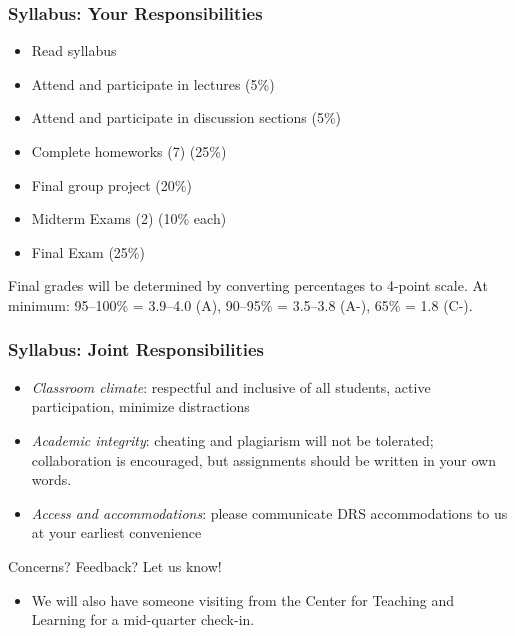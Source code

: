 \documentclass[12pt, 
hyperref={colorlinks=true, linkcolor=blue, urlcolor=cyan}]{beamer}
\begin{document}
\begin{frame}
\frametitle{Syllabus: Your Responsibilities}

\begin{itemize}
\item Read syllabus
\item Attend and participate in lectures \hfill (5\%) %
\item Attend and participate in discussion sections \hfill (5\%) %
\item Complete homeworks (7) \hfill (25\%)
\item Final group project \hfill (20\%) %
\item Midterm Exams (2) \hfill (10\% each)
\item Final Exam \hfill (25\%)
\end{itemize}

Final grades will be determined by converting percentages to 4-point scale. At minimum: 95--100\% = 3.9--4.0 (A), 90--95\% = 3.5--3.8 (A-), 65\% = 1.8 (C-).
\end{frame}

\begin{frame}
\frametitle{Syllabus: Joint Responsibilities}
\begin{itemize}
\item \textit{Classroom climate}: respectful and inclusive of all students, active participation, minimize distractions %
\item \textit{Academic integrity}: cheating and plagiarism will not be tolerated; collaboration is encouraged, but assignments should be written in your own words.
\item \textit{Access and accommodations}: please communicate DRS accommodations to us at your earliest convenience
\end{itemize}

Concerns? Feedback? Let us know!
\begin{itemize}
\item We will also have someone visiting from the Center for Teaching and Learning for a mid-quarter check-in.
\end{itemize}
\end{frame}
\end{document}

